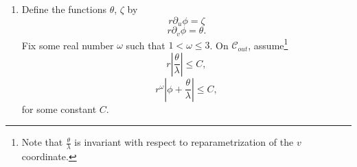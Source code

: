 \documentclass{article}
\newcommand{\tl}{\frac{\theta}{\lambda}}
\begin{document}
\begin{enumerate}
\item[${\bf \Delta}'$.]
Define the functions $\theta$, $\zeta$ by
\begin{equation}
\label{zeta-orismos}
r\partial_u\phi=\zeta
\end{equation}
\begin{equation}
\label{theta-orismos}
r\partial_v\phi=\theta.
\end{equation}
Fix some real number $\omega$ such that $1<\omega\le 3$.
On $\mathcal{C}_{out}$, assume\footnote{Note that $\tl$ is invariant with respect
to reparametrization of the $v$ coordinate.}
\begin{equation}
\label{byil}
r\left|\frac\theta\lambda\right|\le C,
\end{equation}
\begin{equation}
\label{pioduvato}
r^\omega\left|\phi+\frac\theta\lambda\right|\le C,
\end{equation}
for some constant $C$.


\end{enumerate}
\end{document}
